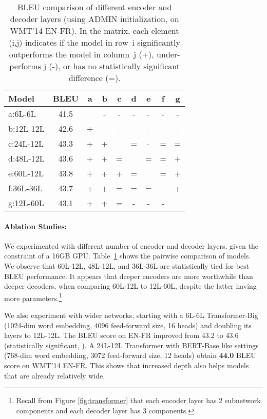 \documentclass[11pt,a4paper]{article}
\begin{document}
\begin{table}[t]
    \centering
    \begin{tabular}{|lc|c|c|c|c|c|c|c|}
    \hline
    {\bf Model} & {\small BLEU} & a & b & c & d & e & f & g  \\
    \hline\hline
    a:6L-6L  & 41.5  &   & - & - & - & - & - & - \\\hline
    b:12L-12L & 42.6 & + &   & - & - & - & - & - \\\hline
    c:24L-12L &  43.3 & + & + &   & = & - & = & = \\\hline
  d:48L-12L &  43.6  & + & + & = &   & = & = & + \\\hline
  e:60L-12L &  43.8  & + & + & + & = &   & = & + \\\hline
  f:36L-36L & 43.7   & + & + & = & = & = &   & + \\\hline
  g:12L-60L & 43.1  & +  & + & = & - & - & - & \\\hline
    \end{tabular}
    \caption{BLEU comparison of different encoder and decoder layers (using ADMIN initialization, on WMT'14 EN-FR). In the matrix, each element (i,j) indicates if the model in row~i significantly outperforms the model in column~j (+), under-performs j (-), or has no statistically significant difference (=). }
    \label{tab:layer_ablation}
\vspace{-4mm}    
\end{table}


\paragraph{Ablation Studies:}
We experimented with different number of encoder and decoder layers, given the constraint of a 16GB GPU.
Table~\ref{tab:layer_ablation} shows the pairwise comparison of models. 
We observe that 60L-12L, 48L-12L, and 36L-36L are statistically tied for best BLEU performance. 
It appears that deeper encoders are more worthwhile than deeper decoders, when comparing 60L-12L to 12L-60L, despite the latter having more parameters.\footnote{Recall from Figure \ref{fig:transformer} that each encoder layer has 2 subnetwork components and each decoder layer has 3 components.}

We also experiment with wider networks, starting with a 6L-6L Transformer-Big (1024-dim word embedding, 4096 feed-forward size, 16 heads) and doubling its layers to 12L-12L. The BLEU score on EN-FR improved from 43.2 to 43.6 (statistically significant, ).
A 24L-12L Transformer with BERT-Base like settings (768-dim word embedding, 3072 feed-forward size, 12 heads) obtain \textbf{44.0} BLEU score on WMT'14 EN-FR.
This shows that increased depth also helps models that are already relatively wide.
\end{document}
